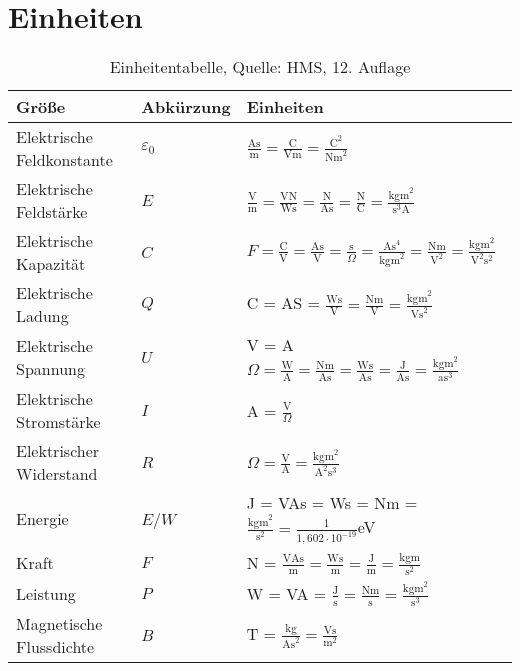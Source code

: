 \chapter{Einheiten}
	\begin{table}[ht]
	\begin{tabularx}{\textwidth}{lll}
	Größe & Abkürzung & Einheiten\\
	\toprule
	Elektrische Feldkonstante & $\varepsilon_0$ 
	& $\frac{\mathrm{As}}{\mathrm{m}}=\frac{\mathrm{C}}{\mathrm{Vm}}=\frac{\mathrm{C}^2}{\mathrm{Nm}^2}$\\
	\midrule
	Elektrische Feldstärke & $E$ 
	& $\frac{\mathrm{V}}{\mathrm{m}}=\frac{\mathrm{VN}}{\mathrm{Ws}}=\frac{\mathrm{N}}{\mathrm{As}}=\frac{\mathrm{N}}{\mathrm{C}}=\frac{\mathrm{kgm}^2}{\mathrm{s}^3\mathrm{A}}$\\
	\midrule
	Elektrische Kapazität & $C$ 
	& $F=\frac{\mathrm{C}}{\mathrm{V}}=\frac{\mathrm{As}}{\mathrm{V}}=\frac{\mathrm{s}}{\Omega}=\frac{\mathrm{As}^4}{\mathrm{kgm}^2}=\frac{\mathrm{Nm}}{\mathrm{V}^2}=\frac{\mathrm{kgm}^2}{\mathrm{V}^2\mathrm{s}^2}$\\
	\midrule
	Elektrische Ladung & $Q$ & C = AS = $\frac{\mathrm{Ws}}{\mathrm{V}}=\frac{\mathrm{Nm}}{\mathrm{V}}=\frac{\mathrm{kgm}^2}{\mathrm{Vs}^2}$\\
	\midrule
	Elektrische Spannung & $U$ & V = A$\Omega = \frac{\mathrm{W}}{\mathrm{A}} = \frac{\mathrm{Nm}}{\mathrm{As}} = \frac{\mathrm{Ws}}{\mathrm{As}} = \frac{\mathrm{J}}{\mathrm{As}} = \frac{\mathrm{kgm}^2}{\mathrm{as}^3}$\\
	\midrule
	Elektrische Stromstärke & $I$ & A = $\frac{\mathrm{V}}{\Omega}$\\
	\midrule
	Elektrischer Widerstand & $R$ & $\Omega=\frac{\mathrm{V}}{\mathrm{A}}=\frac{\mathrm{kgm}^2}{\mathrm{A}^2\mathrm{s}^3}$\\
	\midrule
	Energie & $E$/$W$ & J = VAs = Ws = Nm = $\frac{\mathrm{kgm}^2}{\mathrm{s}^2}=\frac{1}{1,602\cdot10^{-19}}$eV\\
	\midrule
	Kraft & $F$ & N = $\frac{\mathrm{VAs}}{\mathrm{m}}=\frac{\mathrm{Ws}}{\mathrm{m}}=\frac{\mathrm{J}}{\mathrm{m}}=\frac{\mathrm{kgm}}{\mathrm{s}^2}$\\
	\midrule
	Leistung & $P$ & W = VA = $\frac{\mathrm{J}}{\mathrm{s}}=\frac{\mathrm{Nm}}{\mathrm{s}}=\frac{\mathrm{kgm}^2}{\mathrm{s}^3}$\\
	\midrule
	Magnetische Flussdichte & $B$ & T = $\frac{\mathrm{kg}}{\mathrm{As}^2}=\frac{\mathrm{Vs}}{\mathrm{m}^2}$\\
	\bottomrule
	\end{tabularx}
	\label{Einheiten}
	\caption{Einheitentabelle, Quelle: HMS, 12. Auflage}
	\end{table}
